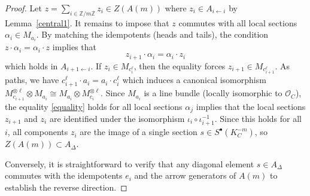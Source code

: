 \documentclass[11pt]{amsart}
\theoremstyle{plain}
\theoremstyle{definition}
\theoremstyle{remark}
\def\O{\mathcal{O}}
\def\zm{\mathbb{Z}/m\mathbb{Z}}
\begin{document}
\begin{proof}
    Let $z= \sum_{i\in \zm}z_i\in Z(A(m))$ where $z_i\in A_{i\leftarrow i}$ by Lemma~\ref{central1}. It remains to impose that $z$ commutes with all local sections $\alpha_i\in M_{a_i}$. By matching the idempotents (heads and tails), the condition $z\cdot \alpha_i = \alpha_i \cdot z$ implies that 
    \begin{equation}\label{equality}
        z_{i+1}\cdot \alpha_i = \alpha_i\cdot z_{i}
    \end{equation}
    which holds in $A_{i+1\leftarrow i}$. If $z_i\in M_{c_i^\ell}$, then the equality forces $z_{i+1}\in M_{c_{i+1}^\ell}.$ As paths, we have $c_{i+1}^\ell \cdot a_i = a_i \cdot c_{i}^{\ell}$ which induces a canonical isomorphism $M_{c_{i+1}}^{\otimes \ell}\otimes M_{a_i} \cong M_{a_i}\otimes M_{c_i}^{\otimes \ell}$. Since $M_{a_i}$ is a line bundle (locally isomorphic to $\O_C$), the equality \ref{equality} holds for all local sections $\alpha_j$ implies that the local sections $z_{i+1}$ and $z_i$ are identified under the isomorphism $\iota_i \circ \iota_{i+1}^{-1}$. Since this holds for all $i$, all components $z_i$ are the image of a single section $s\in S^\bullet(K_C^{-m})$, so $Z(A(m))\subset A_\Delta$. 

    Conversely, it is straightforward to verify that any diagonal element $s\in A_{\Delta}$ commutes with the idempotents $e_i$ and the arrow generators of $A(m)$ to establish the reverse direction. 
\end{proof}
\end{document}
